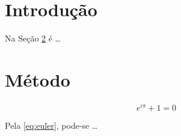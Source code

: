 \documentclass{article}
\begin{document}
\section{Introdução}
\label{sec:intro}

Na Seção \ref{sec:method} é \ldots

\section{Método}
\label{sec:method}

\begin{equation}
\label{eq:euler}
e^{i\pi} + 1 = 0
\end{equation}

Pela \eqref{eq:euler}, pode-se \ldots
\end{document}
